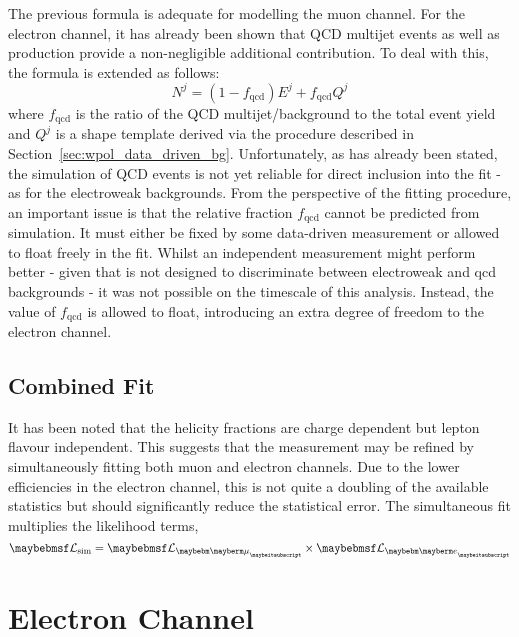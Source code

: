 The previous formula is adequate for modelling the muon channel. For the
electron channel, it has already been shown that \ac{QCD} multijet events as
well as \gammajets production provide a non-negligible additional
contribution. To deal with this, the formula is extended as follows:
\begin{equation}
N^j = (1 - f_{\textrm{qcd}}) E^j + f_{\textrm{qcd}}Q^j
\end{equation}
where $f_{\textrm{qcd}}$ is the ratio of the QCD multijet/\gammajets background
to the total event yield and $Q^j$ is a shape template derived via the procedure
described in Section~\ref{sec:wpol_data_driven_bg}. Unfortunately, as has
already been stated, the simulation of QCD events is not yet reliable for direct
inclusion into the fit - as for the electroweak backgrounds. From the
perspective of the fitting procedure, an important issue is that the relative
fraction $f_{\textrm{qcd}}$ cannot be predicted from simulation. It must either
be fixed by some data-driven measurement or allowed to float freely in the
fit. Whilst an independent measurement might perform better - given that \LP is
not designed to discriminate between electroweak and qcd backgrounds - it was
not possible on the timescale of this analysis. Instead, the value of
$f_{\textrm{qcd}}$ is allowed to float, introducing an extra degree of freedom
to the electron channel.

\subsection{Combined Fit}
It has been noted that the helicity fractions are charge dependent but lepton
flavour independent. This suggests that the measurement may be refined by
simultaneously fitting both muon and electron channels. Due to the lower
efficiencies in the electron channel, this is not quite a doubling of the
available statistics but should significantly reduce the statistical error. The
simultaneous fit multiplies the likelihood terms,
\begin{equation*}
\likelihood_{\textrm{sim}} = \likelihood_{\Pgm} \times \likelihood_{\Pe}
\end{equation*}


\section{Electron Channel}
